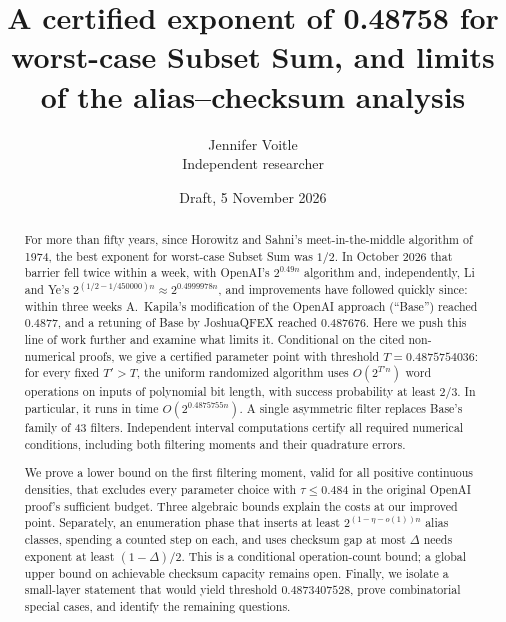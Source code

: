 \documentclass[11pt]{article}
\theoremstyle{plain}
\begin{document}
\title{A certified exponent of 0.48758 for worst-case Subset Sum, and limits of the alias--checksum analysis}
\author{Jennifer Voitle\\ Independent researcher}
\date{Draft, 5 November 2026}

\maketitle

\begin{abstract}
For more than fifty years, since Horowitz and Sahni's meet-in-the-middle algorithm of 1974, the best exponent for worst-case Subset Sum was $1/2$. In October 2026 that barrier fell twice within a week, with OpenAI's $2^{0.49n}$ algorithm and, independently, Li and Ye's $2^{(1/2 - 1/450000)n} \approx 2^{0.4999978n}$, and improvements have followed quickly since: within three weeks A.~Kapila's modification of the OpenAI approach (``Base'') reached 0.4877, and a retuning of Base by JoshuaQFEX reached 0.487676. Here we push this line of work further and examine what limits it. Conditional on the cited non-numerical proofs, we give a certified parameter point with threshold $T=0.4875754036$: for every fixed $T'>T$, the uniform randomized algorithm uses $O(2^{T'n})$ word operations on inputs of polynomial bit length, with success probability at least $2/3$. In particular, it runs in time $O(2^{0.4875755n})$. A single asymmetric filter replaces Base's family of 43 filters. Independent interval computations certify all required numerical conditions, including both filtering moments and their quadrature errors.

We prove a lower bound on the first filtering moment, valid for all positive continuous densities, that excludes every parameter choice with $\tau\le0.484$ in the original OpenAI proof's sufficient budget. Three algebraic bounds explain the costs at our improved point. Separately, an enumeration phase that inserts at least $2^{(1-\eta-o(1))n}$ alias classes, spending a counted step on each, and uses checksum gap at most $\Delta$ needs exponent at least $(1-\Delta)/2$. This is a conditional operation-count bound; a global upper bound on achievable checksum capacity remains open. Finally, we isolate a small-layer statement that would yield threshold $0.4873407528$, prove combinatorial special cases, and identify the remaining questions.
\end{abstract}

\end{document}
